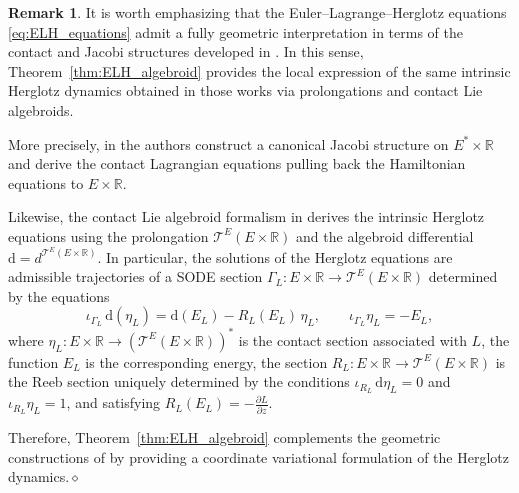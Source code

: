 \documentclass[11pt,a4paper]{article}
\theoremstyle{definition}
\newtheorem{remark}[theorem]{Remark}
\begin{document}
\begin{remark}
It is worth emphasizing that the Euler--Lagrange--Herglotz equations 
\eqref{eq:ELH_equations} admit a fully geometric interpretation
in terms of the contact and Jacobi structures developed in 
\cite{anahory2024euler,anahory2025contact}.  
In this sense, Theorem~\ref{thm:ELH_algebroid} provides the local expression of the same intrinsic Herglotz dynamics obtained in those works via 
prolongations and contact Lie algebroids.

More precisely, in \cite{anahory2024euler} the authors construct a canonical Jacobi structure on $E^{*}\times\mathbb{R}$ and derive the contact Lagrangian equations pulling back the Hamiltonian equations to $E\times \mathbb{R}$.

Likewise, the contact Lie algebroid formalism in \cite{anahory2025contact} derives the intrinsic Herglotz equations using the prolongation 
$\mathcal{T}^{E}(E\times\mathbb{R})$ and the algebroid differential 
$\mathrm{d} = d^{\mathcal{T}^{E}(E\times\mathbb{R})}$.  
In particular, the solutions of the Herglotz equations are admissible trajectories of a SODE section $\Gamma_{L}:E\times \mathbb{R} \to \mathcal{T}^{E}(E\times\mathbb{R})$ determined by the equations
\[
\iota_{\Gamma_{L}}\,\mathrm{d}(\eta_{L})
 = \mathrm{d}(E_{L}) - R_{L}(E_{L})\,\eta_{L},
\qquad
\iota_{\Gamma_{L}}\eta_{L}=-E_{L},
\]
where $\eta_{L}:E\times \mathbb{R} \to (\mathcal{T}^{E}(E\times\mathbb{R}))^{*}$ is the contact section associated with $L$, the function $E_{L}$ is the corresponding energy, the section $R_{L}:E\times \mathbb{R} \to \mathcal{T}^{E}(E\times\mathbb{R})$ is the Reeb section uniquely determined by the conditions 
$\iota_{R_{L}}\,\mathrm{d} \eta_{L}=0$ and $\iota_{R_{L}}\eta_{L}=1$, and satisfying $R_{L}(E_{L})=-\frac{\partial L}{\partial z}$.


Therefore, Theorem~\ref{thm:ELH_algebroid} complements the geometric constructions of 
\cite{anahory2024euler,anahory2025contact} by providing a coordinate variational formulation of the Herglotz dynamics.\hfill$\diamond$
\end{remark}
\end{document}
